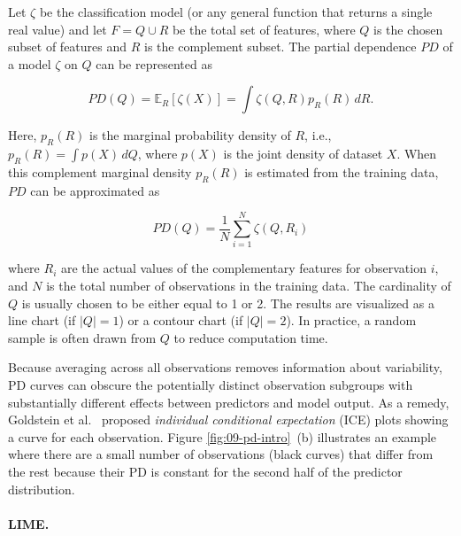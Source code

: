 \documentclass[
  oneside]{book}
\begin{document}
Let \(\zeta\) be the classification model (or any general function that returns a single real value) and let \(F=Q\cup R\) be the total set of features, where \(Q\) is the chosen subset of features and \(R\) is the complement subset.
The partial dependence \(PD\) of a model \(\zeta\) on \(Q\) can be represented as

\begin{equation}
PD(Q)=\mathbb{E}_{R}\left[\zeta(X)\right]=\int\zeta(Q,R)p_R(R)\,dR.
\label{eq:pd}
\end{equation}

Here, \(p_R(R)\) is the marginal probability density of \(R\), i.e., \(p_R(R)=\int p(X)\,dQ\), where \(p(X)\) is the joint density of dataset \(X\).
When this complement marginal density \(p_R(R)\) is estimated from the training data, \(PD\) can be approximated as

\begin{equation}
PD(Q)=\frac{1}{N}\sum_{i=1}^N \zeta(Q,R_{i})
\label{eq:pd-approx}
\end{equation}

where \(R_i\) are the actual values of the complementary features for observation \(i\), and \(N\) is the total number of observations in the training data.
The cardinality of \(Q\) is usually chosen to be either equal to 1 or 2.
The results are visualized as a line chart (if \(|Q|=1\)) or a contour chart (if \(|Q|=2\)).
In practice, a random sample is often drawn from \(Q\) to reduce computation time.

Because averaging across all observations removes information about variability, PD curves can obscure the potentially distinct observation subgroups with substantially different effects between predictors and model output.
As a remedy, Goldstein et al.~\autocite{Goldstein:ICE2015} proposed \emph{individual conditional expectation} (ICE) plots showing a curve for each observation.
Figure \ref{fig:09-pd-intro}~(b) illustrates an example where there are a small number of observations (black curves) that differ from the rest because their PD is constant for the second half of the predictor distribution.

\paragraph*{LIME.}
\end{document}
